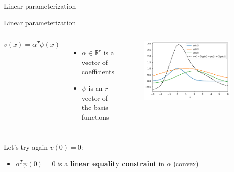 \documentclass[aspectratio=169]{beamer}
\begin{document}
\begin{frame}{Linear parameterization}
\begin{block}{Linear parameterization}
\begin{columns}
$$
v(x) = \alpha^T \psi(x)
$$
\begin{itemize}
\item
$\alpha \in \mathbb R^r$ is a vector of coefficients
\item
$\psi$ is an $r$-vector of the basis functions
\end{itemize}
	\begin{figure}
	\includegraphics[width=\columnwidth]{figures/linear_parameterization.pdf}
\end{figure}
\end{columns}
\end{block}
Let's try again $v(0) = 0$:
\begin{itemize}
	\item
$\alpha^T \psi(0) = 0$ is a \textbf{linear equality constraint} in $\alpha$ (convex)
\end{itemize}
\end{frame}
\end{document}
